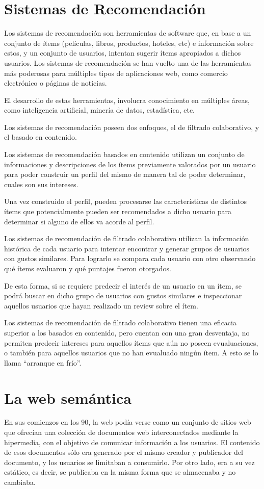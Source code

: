 \section{Sistemas de Recomendación}
\label{section:sistemas-de-recomendación}
Los sistemas de recomendación son herramientas de software que, en base a un conjunto de ítems (películas, libros, productos, hoteles, etc) e información sobre estos, y un conjunto de usuarios, intentan sugerir ítems apropiados a dichos usuarios. Los sistemas de recomendación se han vuelto una de las herramientas más poderosas para múltiples tipos de aplicaciones web, como comercio electrónico o páginas de noticias. 

El desarrollo de estas herramientas, involucra conocimiento en múltiples áreas, como inteligencia artificial, minería de datos, estadística, etc. 

Los sistemas de recomendación poseen dos enfoques, el de filtrado colaborativo, y el basado en contenido.

Los sistemas de recomendación basados en contenido utilizan un conjunto de informaciones y descripciones de los ítems previamente valorados por un usuario para poder construir un perfil del mismo de manera tal de poder determinar, cuales son sus intereses.

Una vez construido el perfil, pueden procesarse las características de distintos ítems que potencialmente pueden ser recomendados a dicho usuario para determinar si alguno de ellos va acorde al perfil.

Los sistemas de recomendación de filtrado colaborativo utilizan la información histórica de cada usuario para intentar encontrar y generar grupos de usuarios con gustos similares. Para lograrlo se compara cada usuario con otro observando qué ítems evaluaron y qué puntajes fueron otorgados. 

De esta forma, si se requiere predecir el interés de un usuario en un ítem, se podrá buscar en dicho grupo de usuarios con gustos similares e inspeccionar aquellos usuarios que hayan realizado un review sobre el ítem.

Los sistemas de recomendación de filtrado colaborativo tienen una eficacia superior a los basados en contenido, pero cuentan con una gran desventaja, no permiten predecir intereses para aquellos ítems que aún no poseen evualuaciones, o también para aquellos usuarios que no han evualuado ningún ítem.  A esto se lo llama “arranque en frío”.

\section{La web semántica}
\label{section:la-web-semantica}
En sus comienzos en los 90, la web podía verse como un conjunto de sitios web que ofrecían una colección de documentos web interconectados mediante la hipermedia, con el objetivo de comunicar información a los usuarios.
El contenido de esos documentos sólo era generado por el mismo creador y publicador del documento, y los usuarios se limitaban a consumirlo. Por otro lado, era a su vez estático, es decir, se publicaba en la misma forma que se almacenaba y no cambiaba.  

